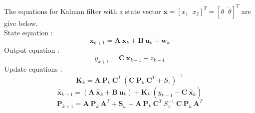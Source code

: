 The equations for Kalman filter with a state vector $\bm{x} = [x_1\;\;x_2]^T = [\theta\;\;\dot{\theta}]^T$ are give below.\\

State equation :
\begin{equation}
\label{eqn:5_kalmanstate}
\bm{x}_{k+1} = \bm{A}\:\bm{x}_k + \bm{B}\:\bm{u}_k + \bm{w}_k
\end{equation}
Output equation :
\begin{equation}
\label{eqn:5_kalmanop}
y_{k+1} = \bm{C}\:\bm{x}_{k+1} + z_{k+1}
\end{equation}
Update equations :
\begin{equation}
\label{eqn:5_kalmanK}
\bm{K}_k = \bm{A}\:\bm{P}_k\:\bm{C}^T\:\left( \bm{C}\:\bm{P}_k\:\bm{C}^T + S_z\right)^{-1}
\end{equation}
\begin{equation}
\label{eqn:5_kalmanhat}
\hat{\bm{x}}_{k+1} = \left( \bm{A}\:\hat{\bm{x}}_k + \bm{B}\:\bm{u}_k \right ) + \bm{K}_k\:\left ( y_{k+1} - \bm{C}\:\hat{\bm{x}}_k\right)
\end{equation}
\begin{equation}
\label{eqn:5_kalmanP}
\bm{P}_{k+1} = \bm{A}\:\bm{P}_k\:\bm{A}^T + \bm{S}_w - \bm{A}\:\bm{P}_k\:\bm{C}^T\:S_z^{-1}\:\bm{C}\:\bm{P}_k\:\bm{A}^T
\end{equation}


